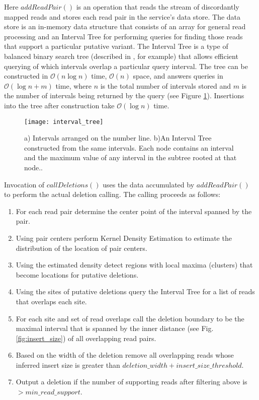 Here $addReadPair()$ is an operation that reads the stream of discordantly mapped reads and stores each read pair in the service's data store. The data store is an in-memory data structure that consists of an array for general read processing and an Interval Tree for performing queries for finding those reads that support a particular putative variant. The Interval Tree is a type of balanced binary search tree (described in \autocite{cormen2009introduction}, for example) that allows efficient querying of which intervals overlap a particular query interval. The tree can be constructed in $\mathcal{O}(n\log{}n)$ time, $\mathcal{O}(n)$ space, and answers queries in $\mathcal{O}(\log{}n + m)$ time, where $n$ is the total number of intervals stored and $m$ is the number of intervals being returned by the query (see Figure \ref{fig:interval_tree}). Insertions into the tree after construction take $\mathcal{O}(\log{}n)$ time.

\begin{figure}[H]
    \texttt{[image: interval\_tree]}
    \centering
    \caption {a) Intervals arranged on the number line. b)An Interval Tree constructed from the same intervals. Each node contains an interval and the maximum value of any interval in the subtree rooted at that node.\autocite{cormen2009introduction}.}
    \label{fig:interval_tree}
\end{figure}

Invocation of $callDeletions()$ uses the data accumulated by $addReadPair()$ to perform the actual deletion calling. The calling proceeds as follows:

\begin{enumerate}
    \item For each read pair determine the center point of the interval spanned by the pair.
    \item Using pair centers perform Kernel Density Estimation\autocites{rosenblatt1956remarks}{parzen1962estimation} to estimate the distribution of the location of pair centers.
    \item Using the estimated density detect regions with local maxima (clusters) that become locations for putative deletions.
    \item Using the sites of putative deletions query the Interval Tree for a list of reads that overlaps each site.
    \item For each site and set of read overlaps call the deletion boundary to be the maximal interval that is spanned by the inner distance (see Fig. \ref{fig:insert_size}) of all overlapping read pairs.
    \item Based on the width of the deletion remove all overlapping reads whose inferred insert size is greater than $deletion\_width + insert\_size\_threshold$.
    \item Output a deletion if the number of supporting reads after filtering above is $> min\_read\_support$.
\end{enumerate}

